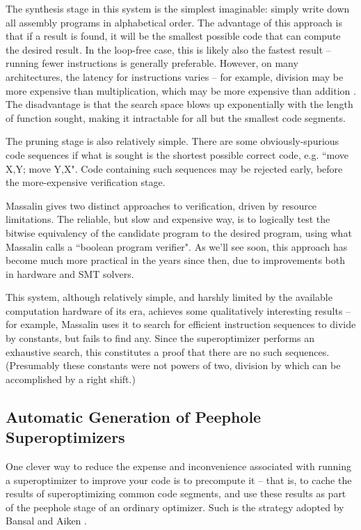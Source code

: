 \documentclass[12pt,twoside]{reedthesis}
\begin{document}
            The synthesis stage in this system is the simplest imaginable: simply write down all assembly programs in alphabetical order.
            The advantage of this approach is that if a result is found, it will be the smallest possible code that can compute the desired result.
            In the loop-free case, this is likely also the fastest result -- running fewer instructions is generally preferable.
            However, on many architectures, the latency for instructions varies -- for example, division may be more expensive than multiplication, which may be more expensive than addition \cite{fog2022instructiontables}.
            The disadvantage is that the search space blows up exponentially with the length of function sought, making it intractable for all but the smallest code segments.
                
            The pruning stage is also relatively simple.
            There are some obviously-spurious code sequences if what is sought is the shortest possible correct code, e.g. ``move X,Y; move Y,X".
            Code containing such sequences may be rejected early, before the more-expensive verification stage.
                
            Massalin gives two distinct approaches to verification, driven by resource limitations.
            The reliable, but slow and expensive way, is to logically test the bitwise equivalency of the candidate program to the desired program, using what Massalin calls a ``boolean program verifier".
            As we'll see soon, this approach has become much more practical in the years since then, due to improvements both in hardware and SMT solvers. 
                
            This system, although relatively simple, and harshly limited by the available computation hardware of its era, achieves some qualitatively interesting results -- for example, Massalin uses it to search for efficient instruction sequences to divide by constants, but fails to find any.
            Since the superoptimizer performs an exhaustive search, this constitutes a proof that there are no such sequences. (Presumably these constants were not powers of two, division by which can be accomplished by a right shift.)

        \subsection{Automatic Generation of Peephole Superoptimizers}
            One clever way to reduce the expense and inconvenience associated with running a superoptimizer to improve your code is to precompute it
            -- that is, to cache the results of superoptimizing common code segments, and use these results as part of the peephole stage of an ordinary optimizer.
            Such is the strategy adopted by Bansal and Aiken \cite{bansal2006peephole}.
            
\end{document}
